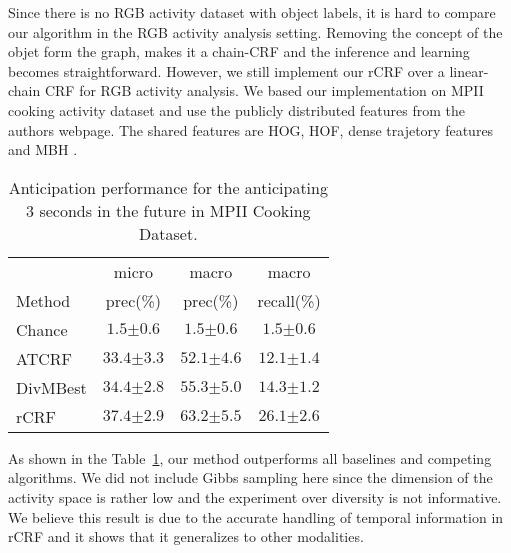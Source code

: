 Since there is no RGB activity dataset with object labels, it is hard to compare our algorithm in the RGB activity analysis setting. Removing the concept of the objet form the graph, makes it a chain-CRF and the inference and learning becomes straightforward. However, we still implement our rCRF over a linear-chain CRF for RGB activity analysis. We based our implementation on MPII cooking activity dataset \cite{mpi_cooking} and use the publicly distributed features from the authors webpage. The shared features are HOG, HOF, dense trajetory features and  MBH \cite{dalal}.


\begin{table}
  \caption{Anticipation performance for the anticipating 3 seconds in the future in MPII Cooking Dataset\cite{mpi_cooking}.}
\begin{tabular}{l|ccc} \hline
& micro & macro & macro  \\
Method & prec(\%) & prec(\%) & recall(\%) \\ \hline
Chance & $1.5${\scriptsize $\pm 0.6$} & $1.5${\scriptsize $\pm 0.6$}  & $1.5${\scriptsize $\pm 0.6$}  \\
ATCRF \cite{hemaAnt} & $33.4${\scriptsize $\pm 3.3$} & $52.1${\scriptsize $\pm 4.6$}  & $12.1${\scriptsize $\pm 1.4$}  \\
DivMBest\cite{divmbest} & $34.4${\scriptsize $\pm 2.8$} & $55.3${\scriptsize $\pm 5.0$}  & $14.3${\scriptsize $\pm 1.2$}  \\
rCRF & $\mathbf{37.4}${\scriptsize $\mathbf{\pm 2.9}$} & $\mathbf{63.2}${\scriptsize $\mathbf{\pm 5.5}$}  & $\mathbf{26.1}${\scriptsize $\mathbf{\pm 2.6}$}  \\
\hline
\end{tabular}
\label{Tantmpi}
\end{table}

As shown in the Table~\ref{Tantmpi}, our method outperforms all baselines and competing algorithms. We did not include Gibbs sampling here since the dimension of the activity space is rather low and the experiment over diversity is not informative. We believe this result is due to the accurate handling of temporal information in rCRF and it shows that it generalizes to other modalities.
